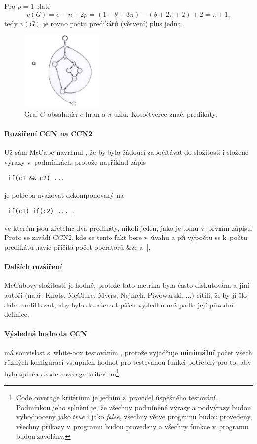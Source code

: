 \documentclass[11pt,twoside,a4paper]{book}
\begin{document}
Pro $p = 1$ platí
$$v(G) = e - n + 2p = (1 + \theta + 3\pi) - (\theta + 2\pi + 2) + 2 = \pi + 1,$$
tedy $v(G)$ je rovno počtu predikátů (větvení) plus jedna.

\begin{figure}[H]
\begin{center}
\includegraphics[width=4cm]{figures/ccn_simplify_example.pdf}
\caption{Graf $G$ obsahující $e$ hran a $n$ uzlů. Kosočtverce značí predikáty.}
\label{fig:ccn_simplify_example}
\end{center}
\end{figure}


\paragraph{Rozšíření CCN na CCN2}
Už sám McCabe navrhnul \cite{CCN}, že by bylo žádoucí započítávat do složitosti i složené výrazy v~podmínkách, protože například zápis
\begin{verbatim} if(c1 && c2) ... \end{verbatim}
je potřeba uvažovat dekomponovaný na
\begin{verbatim} if(c1) if(c2) ... ,\end{verbatim}
ve kterém jsou zřetelné dva predikáty, nikoli jeden, jako je tomu v~prvním zápisu. Proto se zavádí CCN2, kde se tento fakt
bere v~úvahu a při výpočtu se k~počtu predikátů navíc přičítá počet operátorů \&\& a ||.

\paragraph{Dalších rozšíření} McCabovy složitosti je hodně, protože tato metrika byla často diskutována a jiní autoři
(např. Knots, McClure, Myers, Nejmeh, Piwowarski, ...) \cite{CCN_extra} cítili, že
by ji šlo dále modifikovat, aby bylo dosaženo lepších výsledků než podle její původní definice.

\paragraph{Výsledná hodnota CCN} má souvislost s~white-box testováním \cite{CCN}, protože vyjadřuje \textbf{minimální} počet všech různých konfigurací
vstupních hodnot pro testovanou funkci potřebný pro to, aby bylo splněno code coverage kritérium\footnote{Code coverage kritérium je jedním
z~pravidel úspěšného testování \cite{CodeCoverage}. Podmínkou jeho splnění je, že všechny podmíněné výrazy a podvýrazy budou vyhodnoceny jako \textit{true}
i jako \textit{false}, všechny větve programu budou provedeny, všechny příkazy v~programu budou provedeny a všechny funkce v~programu budou zavolány.}.
\end{document}

